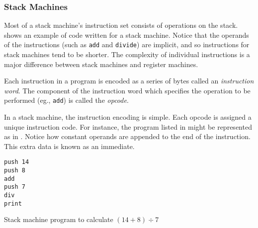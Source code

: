 			\subsubsection{Stack Machines}
			Most of a stack machine's instruction set consists of operations on the stack.  shows an example of code written for a stack machine. Notice that the operands of the instructions (such as \texttt{add} and \texttt{divide}) are implicit, and so instructions for stack machines tend to be shorter. The complexity of individual instructions is a major difference between stack machines and register machines. 
			
			Each instruction in a program is encoded as a series of bytes called an \emph{instruction word}. The component of the instruction word which specifies the operation to be performed (eg., \texttt{add}) is called the \emph{opcode}. 
			
			In a stack machine, the instruction encoding is simple. Each opcode is assigned a unique instruction code. For instance, the program listed in  might be represented as in . Notice how constant operands are appended to the end of the instruction. This extra data is known as an immediate.
			
			\begin{doublefig}
				\begin{halffig}
					\begin{lstlisting}
push 14
push 8
add
push 7
div
print
					\end{lstlisting}
					\caption{Stack machine program to calculate $(14+8)\div7$}
					\label{fig:stackprogram}
				\end{halffig}
			\end{doublefig}
			
